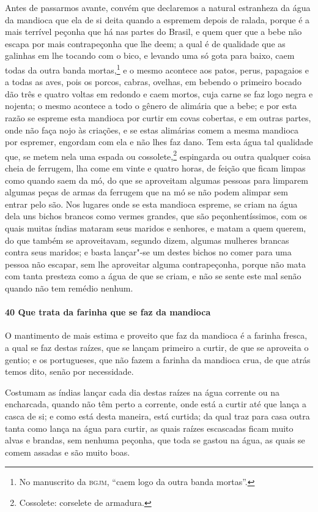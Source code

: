 Antes de passarmos avante, convém que declaremos a natural estranheza da água da mandioca
que ela de si deita quando a espremem depois de ralada, porque é a mais terrível peçonha
que há nas partes do Brasil, e quem quer que a bebe não escapa por mais contrapeçonha que
lhe deem; a qual é de qualidade que as galinhas em lhe tocando com o bico, e levando uma
só gota para baixo, caem todas da outra banda mortas,\footnote{ No manuscrito da
\textsc{bgjm}, ``caem logo da outra banda mortas''.} e o mesmo acontece aos patos, perus,
papagaios e a todas as aves, pois os porcos, cabras, ovelhas, em bebendo o primeiro bocado
dão três e quatro voltas em redondo e caem mortos, cuja carne se faz logo negra e nojenta;
o mesmo acontece a todo o gênero de alimária que a bebe; e por esta razão se espreme esta
mandioca por curtir em covas cobertas, e em outras partes, onde não faça nojo às criações,
e se estas alimárias comem a mesma mandioca por espremer, engordam com ela e não lhes faz
dano. Tem esta água tal qualidade que, se metem nela uma espada ou cossolete,\footnote{Cossolete: 
corselete de armadura.} espingarda
ou outra qualquer coisa cheia de ferrugem, lha come em vinte
e quatro horas, de feição que ficam limpas como quando saem da mó, do que se aproveitam
algumas pessoas para limparem algumas peças de armas da ferrugem que na mó se não podem
alimpar sem entrar pelo são. Nos lugares onde se esta mandioca espreme, se criam na água
dela uns bichos brancos como vermes grandes, que são peçonhentíssimos, com os quais muitas
índias mataram seus maridos e senhores, e matam a quem querem, do que também se
aproveitavam, segundo dizem, algumas mulheres brancas contra seus maridos; e basta
lançar"-se um destes bichos no comer para uma pessoa não escapar, sem lhe aproveitar alguma
contrapeçonha, porque não mata com tanta presteza como a água de que se criam, e não se
sente este mal senão quando não tem remédio nenhum.

\paragraph{40 Que trata da farinha que se faz da mandioca}

O mantimento de mais estima e proveito que faz da mandioca é a farinha fresca, a qual se
faz destas raízes, que se lançam primeiro a curtir, de que se aproveita o gentio; e os
portugueses, que não fazem a farinha da mandioca crua, de que atrás temos dito, senão por
necessidade.

Costumam as índias lançar cada dia destas raízes na água corrente ou na encharcada, quando
não têm perto a corrente, onde está a curtir até que lança a casca de si; e como está
desta maneira, está curtida; da qual traz para casa outra tanta como lança na água para
curtir, as quais raízes escascadas ficam muito alvas e brandas, sem nenhuma peçonha, que
toda se gastou na água, as quais se comem assadas e são muito boas.

